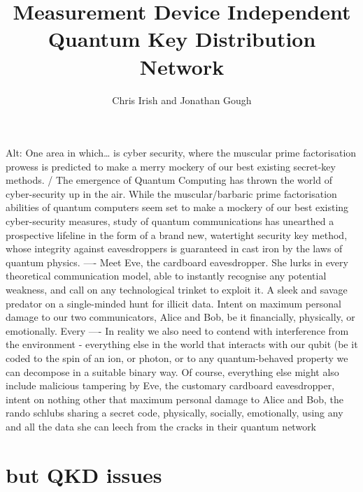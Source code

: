\documentclass[journal]{vgtc}
\title{Measurement Device Independent Quantum Key Distribution Network}
\author{Chris Irish and Jonathan Gough}
\begin{document}

\maketitle

Alt: One area in which… is cyber security, where the
muscular prime factorisation prowess is predicted to make
a merry mockery of our best existing secret-key methods. /
The emergence of Quantum Computing has thrown the
world of cyber-security up in the air.
While the muscular/barbaric prime factorisation abilities of
quantum computers seem set to make a mockery of our
best existing cyber-security measures, study of quantum
communications has unearthed a prospective lifeline in the
form of a brand new, watertight security key method,
whose integrity against eavesdroppers is guaranteed in
cast iron by the laws of quantum physics.
----
Meet Eve, the cardboard eavesdropper. She lurks in every
theoretical communication model, able to instantly
recognise any potential weakness, and call on any
technological trinket to exploit it. A sleek and savage
predator on a single-minded hunt for illicit data. Intent on
maximum personal damage to our two communicators,
Alice and Bob, be it financially, physically, or emotionally.
Every
----
In reality we also need to contend with interference from
the environment - everything else in the world that
interacts with our qubit (be it coded to the spin of an ion, or
photon, or to any quantum-behaved property we can
decompose in a suitable binary way.
Of course, everything else might also include malicious
tampering by Eve, the customary cardboard
eavesdropper, intent on nothing other that maximum
personal damage to Alice and Bob, the rando schlubs
sharing a secret code, physically, socially, emotionally,
using any and all the data she can leech from the cracks
in their quantum network



\section{but QKD issues}
\end{document}
